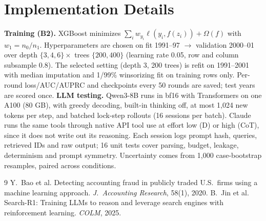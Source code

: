 \documentclass[9pt,twocolumn,letterpaper]{extarticle}
\begin{document}
\section{Implementation Details}
\textbf{Training (B2).} XGBoost minimizes $\sum_i w_{y_i}\ell(y_i,f(z_i))+\Omega(f)$ with $w_1=n_0/n_1$. Hyperparameters are chosen on fit 1991--97 $\to$ validation 2000--01 over depth $\{3,4,6\}\times$ trees $\{200,400\}$ (learning rate 0.05, row and column subsample 0.8). The selected setting (depth 3, 200 trees) is refit on 1991--2001 with median imputation and 1/99\% winsorizing fit on training rows only. Per-round loss/AUC/AUPRC and checkpoints every 50 rounds are saved; test years are scored once.
\textbf{LLM testing.} Qwen3-8B runs in bf16 with Transformers on one A100 (80 GB), with greedy decoding, built-in thinking off, at most 1{,}024 new tokens per step, and batched lock-step rollouts (16 sessions per batch). Claude runs the same tools through native API tool use at effort low (D) or high (CoT), since it does not write out its reasoning. Each session logs prompt hash, queries, retrieved IDs and raw output; 16 unit tests cover parsing, budget, leakage, determinism and prompt symmetry. Uncertainty comes from 1{,}000 case-bootstrap resamples, paired across conditions.

\vspace{-4pt}
{\footnotesize
\begin{thebibliography}{9}\setlength{\itemsep}{0pt}
 Y.~Bao et al. Detecting accounting fraud in publicly traded U.S.\ firms using a machine learning approach. \emph{J.\ Accounting Research}, 58(1), 2020.
 B.~Jin et al. Search-R1: Training LLMs to reason and leverage search engines with reinforcement learning. \emph{COLM}, 2025.
\end{thebibliography}}
\end{document}
